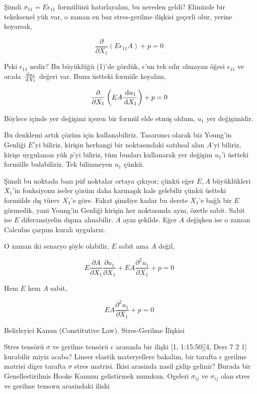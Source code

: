 \documentclass[12pt,fleqn]{article}\usepackage{../../common}
\begin{document}
Şimdi $\sigma_{11} = E \epsilon_{11}$ formülünü hatırlayalım, bu nereden geldi?
Elimizde bir tekeksenel yük var, o zaman en baz stres-gerilme ilişkisi geçerli
olur, yerine koyarsak,

$$
\frac{\partial }{\partial X_1} (E \epsilon_{11} A ) + p = 0
$$

Peki $\epsilon_{11}$ nedir? Bu büyüklüğü (1)'de gördük, $\epsilon$'un tek sıfır
olmayan öğesi $\epsilon_{11}$ ve orada $\frac{\,\mathrm{d} u_1}{\,\mathrm{d} X_1}$ değeri
var. Bunu üstteki formüle koyalım,

$$
\frac{\partial }{\partial X_1} \left( E A \frac{\,\mathrm{d} u_1}{\,\mathrm{d} X_1} \right) + p = 0
$$

Böylece içinde yer değişimi içeren bir formül elde etmiş oldum, $u_1$ yer
değişimidir.

Bu denklemi artık çözüm için kullanabiliriz. Tasarımcı olarak biz Young'in
Genliği $E$'yi biliriz, kirişin herhangi bir noktasındaki satıhsal alan $A$'yi
biliriz, kirişe uygulanan yük $p$'yi biliriz, tüm bunları kullanarak yer değişim
$u_1$'i üstteki formülle bulabiliriz. Tek bilinmeyen $u_1$ çünkü.

Şimdi bu noktada bazı püf noktalar ortaya çıkıyor; çünkü eğer $E,A$ büyüklükleri
$X_1$'in fonksiyonu iseler çözüm daha karmaşık hale gelebilir çünkü üstteki
formülde dış türev $X_1$'e göre. Fakat şimdiye kadar bu derste $X_1$'e bağlı bir
$E$ görmedik, yani Young'in Genliği kirişin her noktasında aynı, özetle sabit.
Sabit ise $E$ diferansiyelin dışına alınabilir. $A$ aynı şekilde. Eğer $A$
değişken ise o zaman Calculus çarpım kuralı uygularız.

O zaman iki senaryo şöyle olabilir, $E$ sabit ama $A$ değil,

$$
E \frac{\partial A}{\partial X_1} \frac{\partial u_1}{\partial X_1} +
EA \frac{\partial^2 u_1}{\partial X_1} + p = 0
$$

Hem $E$ hem $A$ sabit,

$$
E A \frac{\partial^2 u_1}{\partial X_1} + p = 0
$$

Belirleyici Kanun (Constitutive Law), Stres-Gerilme İlişkisi

Stres tensörü $\sigma$ ve gerilme tensörü $\epsilon$ arasında bir ilişki
[1,  1:15:50][4, Ders 7 2 1] kurabilir miyiz acaba? Lineer elastik materyellere
bakalim, bir tarafta $\epsilon$ gerilme matrisi diger tarafta $\sigma$ stres
matrisi. Ikisi arasinda nasil gidip gelinir? Burada bir Genellestirilmis Hooke
Kanunu gelistirmek mumkun. Ogeleri $\sigma_{ij}$ ve $\sigma_{ij}$ olan
stres ve gerilme tensoru arasindaki iliski
\end{document}
